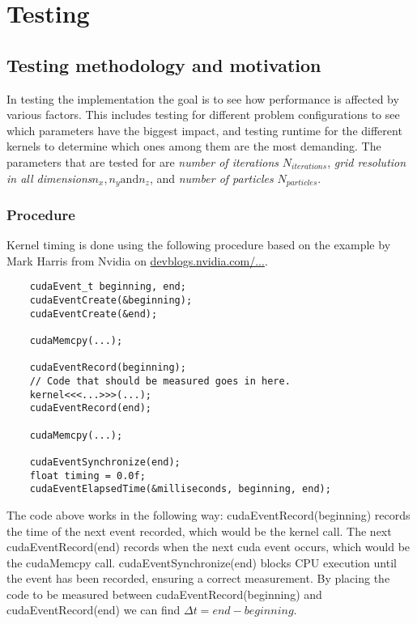 \chapter{Testing}

\section{Testing methodology and motivation}
In testing the implementation the goal is to see how performance is affected by various factors. This includes testing
for different problem configurations to see which parameters have the biggest impact, and testing runtime for the
different kernels to determine which ones among them are the most demanding.
The parameters that are tested for are \emph{number of iterations} $N_{iterations}$, \emph{grid resolution in all
dimensions}$n_x, n_y \text{and} n_z$, and \emph{number of particles} $N_{particles}$.
\subsection{Procedure}
\label{sec:testing-methodology}
Kernel timing is done using the following procedure based on the example by Mark Harris from Nvidia on \href{http://devblogs.nvidia.com/parallelforall/how-implement-performance-metrics-cuda-cc/}{devblogs.nvidia.com/...}.
\begin{lstlisting}
	cudaEvent_t beginning, end;
	cudaEventCreate(&beginning);
	cudaEventCreate(&end);
	
	cudaMemcpy(...);
	
	cudaEventRecord(beginning);
	// Code that should be measured goes in here.
	kernel<<<...>>>(...);
	cudaEventRecord(end);
	
	cudaMemcpy(...);
	
	cudaEventSynchronize(end);
	float timing = 0.0f;
	cudaEventElapsedTime(&milliseconds, beginning, end);
\end{lstlisting}
The code above works in the following way: cudaEventRecord(beginning) records the time of the next event recorded, which
would be the kernel call. The next cudaEventRecord(end) records when the next cuda event occurs, which would be the
cudaMemcpy call. cudaEventSynchronize(end) blocks CPU execution until the event has been recorded, ensuring a correct
measurement. By placing the code to be measured between cudaEventRecord(beginning) and cudaEventRecord(end) we can find
$\Delta t = end - beginning$.

